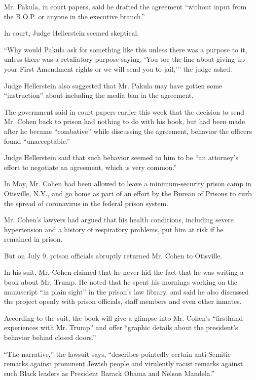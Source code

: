 Mr. Pakula, in court papers, said he drafted the agreement ``without
input from the B.O.P. or anyone in the executive branch.''

In court, Judge Hellerstein seemed skeptical.

``Why would Pakula ask for something like this unless there was a
purpose to it, unless there was a retaliatory purpose saying, `You toe
the line about giving up your First Amendment rights or we will send you
to jail,''' the judge asked.

Judge Hellerstein also suggested that Mr. Pakula may have gotten some
``instruction'' about including the media ban in the agreement.

The government said in court papers earlier this week that the decision
to send Mr. Cohen back to prison had nothing to do with his book, but
had been made after he became ``combative'' while discussing the
agreement, behavior the officers found ``unacceptable.''

Judge Hellerstein said that such behavior seemed to him to be ``an
attorney's effort to negotiate an agreement, which is very common.''

In May, Mr. Cohen had been allowed to leave a minimum-security prison
camp in Otisville, N.Y., and go home as part of an effort by the Bureau
of Prisons to curb the spread of coronavirus in the federal prison
system.

Mr. Cohen's lawyers had argued that his health conditions, including
severe hypertension and a history of respiratory problems, put him at
risk if he remained in prison.

But on July 9, prison officials abruptly returned Mr. Cohen to
Otisville.

In his suit, Mr. Cohen claimed that he never hid the fact that he was
writing a book about Mr. Trump. He noted that he spent his mornings
working on the manuscript ``in plain sight'' in the prison's law
library, and said he also discussed the project openly with prison
officials, staff members and even other inmates.

According to the suit, the book will give a glimpse into Mr. Cohen's
``firsthand experiences with Mr. Trump'' and offer ``graphic details
about the president's behavior behind closed doors.''

``The narrative,'' the lawsuit says, ``describes pointedly certain
anti-Semitic remarks against prominent Jewish people and virulently
racist remarks against such Black leaders as President Barack Obama and
Nelson Mandela.''

